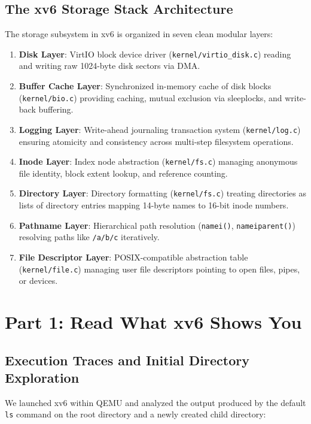 \documentclass[12pt,a4paper]{article}
\begin{document}
\subsection{The xv6 Storage Stack Architecture}
The storage subsystem in xv6 is organized in seven clean modular layers:
\begin{enumerate}
    \item \textbf{Disk Layer}: VirtIO block device driver (\texttt{kernel/virtio\_disk.c}) reading and writing raw 1024-byte disk sectors via DMA.
    \item \textbf{Buffer Cache Layer}: Synchronized in-memory cache of disk blocks (\texttt{kernel/bio.c}) providing caching, mutual exclusion via sleeplocks, and write-back buffering.
    \item \textbf{Logging Layer}: Write-ahead journaling transaction system (\texttt{kernel/log.c}) ensuring atomicity and consistency across multi-step filesystem operations.
    \item \textbf{Inode Layer}: Index node abstraction (\texttt{kernel/fs.c}) managing anonymous file identity, block extent lookup, and reference counting.
    \item \textbf{Directory Layer}: Directory formatting (\texttt{kernel/fs.c}) treating directories as lists of directory entries mapping 14-byte names to 16-bit inode numbers.
    \item \textbf{Pathname Layer}: Hierarchical path resolution (\texttt{namei()}, \texttt{nameiparent()}) resolving paths like \texttt{/a/b/c} iteratively.
    \item \textbf{File Descriptor Layer}: POSIX-compatible abstraction table (\texttt{kernel/file.c}) managing user file descriptors pointing to open files, pipes, or devices.
\end{enumerate}

\newpage

\section{Part 1: Read What xv6 Shows You}

\subsection{Execution Traces and Initial Directory Exploration}
We launched xv6 within QEMU and analyzed the output produced by the default \texttt{ls} command on the root directory and a newly created child directory:
\end{document}
